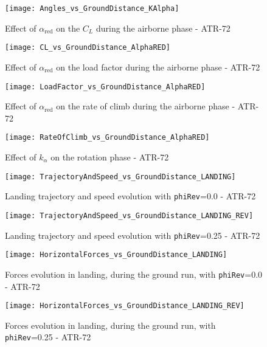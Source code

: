 %
\begin{figure}[!b]
\centering
\texttt{[image: Angles\_vs\_GroundDistance\_KAlpha]}
\caption{Effect of $\alpha_{\text{red}}$ on the $C_L$ during the airborne phase - ATR-72}
\label{fig:kAlphaEffects}
\end{figure}
%
\begin{figure}[H]
\centering
\texttt{[image: CL\_vs\_GroundDistance\_AlphaRED]}
\caption{Effect of $\alpha_{\text{red}}$ on the load factor during the airborne phase - ATR-72}
\label{fig:CLAlphaRED}
\end{figure}
%
\begin{figure}[H]
\centering
\texttt{[image: LoadFactor\_vs\_GroundDistance\_AlphaRED]}
\caption{Effect of $\alpha_{\text{red}}$ on the rate of climb during the airborne phase - ATR-72}
\label{fig:LoadFactorAlphaRED}
\end{figure}
%
\begin{figure}[H]
\centering
\texttt{[image: RateOfClimb\_vs\_GroundDistance\_AlphaRED]}
\caption{Effect of $k_{\alpha}$ on the rotation phase - ATR-72}
\label{fig:RateOfClimbAlphaRED}
\end{figure}
%
%
\begin{figure}[!t]
\centering
\texttt{[image: TrajectoryAndSpeed\_vs\_GroundDistance\_LANDING]}
\caption{Landing trajectory and speed evolution with \lstinline[language=Java]!phiRev!=0.0 - ATR-72}
\label{fig:Landing1}
\end{figure}
%
\begin{figure}[!b]
\centering
\texttt{[image: TrajectoryAndSpeed\_vs\_GroundDistance\_LANDING\_REV]}
\caption{Landing trajectory and speed evolution with \lstinline[language=Java]!phiRev!=0.25 - ATR-72}
\end{figure}
%
\begin{figure}[!t]
\centering
\texttt{[image: HorizontalForces\_vs\_GroundDistance\_LANDING]}
\caption{Forces evolution in landing, during the ground run, with \lstinline[language=Java]!phiRev!=0.0 - ATR-72}
\end{figure}
%
\begin{figure}[!b]
\centering
\texttt{[image: HorizontalForces\_vs\_GroundDistance\_LANDING\_REV]}
\caption{Forces evolution in landing, during the ground run, with \lstinline[language=Java]!phiRev!=0.25 - ATR-72}
\end{figure}
